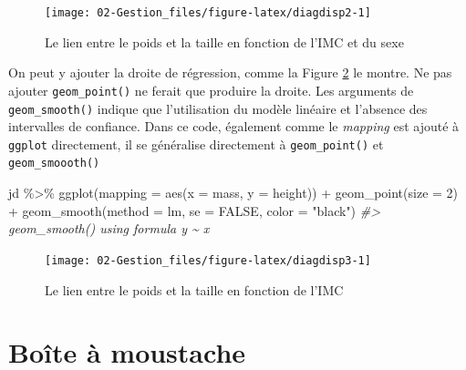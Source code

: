 \documentclass[
]{book}
\newenvironment{Shaded}{}{}
\newcommand{\AttributeTok}[1]{#1}
\newcommand{\CommentTok}[1]{\textit{#1}}
\newcommand{\ConstantTok}[1]{#1}
\newcommand{\DecValTok}[1]{#1}
\newcommand{\FunctionTok}[1]{#1}
\newcommand{\NormalTok}[1]{#1}
\newcommand{\SpecialCharTok}[1]{#1}
\newcommand{\StringTok}[1]{#1}
\begin{document}
\begin{figure}

{\centering \texttt{[image: 02-Gestion\_files/figure-latex/diagdisp2-1]} 

}

\caption{Le lien entre le poids et la taille en fonction de l'IMC et du sexe}\label{fig:diagdisp2}
\end{figure}

On peut y ajouter la droite de régression, comme la Figure \ref{fig:diagdisp3} le montre. Ne pas ajouter \texttt{geom\_point()} ne ferait que produire la droite. Les arguments de \texttt{geom\_smooth()} indique que l'utilisation du modèle linéaire et l'absence des intervalles de confiance. Dans ce code, également comme le \emph{mapping} est ajouté à \texttt{ggplot} directement, il se généralise directement à \texttt{geom\_point()} et \texttt{geom\_smoooth()}

\begin{Shaded}
\begin{Highlighting}[]
\NormalTok{jd }\SpecialCharTok{\%\textgreater{}\%} 
  \FunctionTok{ggplot}\NormalTok{(}\AttributeTok{mapping =} \FunctionTok{aes}\NormalTok{(}\AttributeTok{x =}\NormalTok{ mass, }\AttributeTok{y =}\NormalTok{ height)) }\SpecialCharTok{+} 
  \FunctionTok{geom\_point}\NormalTok{(}\AttributeTok{size =} \DecValTok{2}\NormalTok{) }\SpecialCharTok{+}
  \FunctionTok{geom\_smooth}\NormalTok{(}\AttributeTok{method =}\NormalTok{ lm, }\AttributeTok{se =} \ConstantTok{FALSE}\NormalTok{, }\AttributeTok{color =} \StringTok{"black"}\NormalTok{)}
\CommentTok{\#\textgreater{} \textasciigrave{}geom\_smooth()\textasciigrave{} using formula \textquotesingle{}y \textasciitilde{} x\textquotesingle{}}
\end{Highlighting}
\end{Shaded}

\begin{figure}

{\centering \texttt{[image: 02-Gestion\_files/figure-latex/diagdisp3-1]} 

}

\caption{Le lien entre le poids et la taille en fonction de l'IMC}\label{fig:diagdisp3}
\end{figure}

\hypertarget{bouxeete-uxe0-moustache}{%
\section{Boîte à moustache}\label{bouxeete-uxe0-moustache}}
\end{document}
